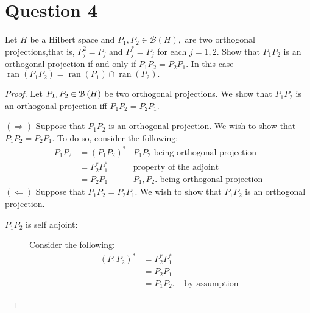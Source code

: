 \section{Question 4}
\horz

Let $H$ be a Hilbert space and $P_1, P_2\in \mathcal B(H),$ are two orthogonal projections,that is, $P_j^2=P_j$ and $P_j^*=P_j$ for each $j=1,2$. Show that $P_1P_2$ is an orthogonal projection if and only if $P_1P_2= P_2P_1.$ In this case $\operatorname{ran} (P_1P_2)= \operatorname{ran} (P_1) \cap \operatorname {ran}(P_2).$

\horz

\begin{proof}
    Let $P_{1}, P_{2} \in {\cal B} \left( H \right)$ be two orthogonal projections.
    We show that $P_{1} P_{2}$ is an orthogonal projection iff $P_{1} P_{2} = P_{2} P_{1}$. 

    $\left( \Longrightarrow \right)$ Suppose that $P_{1} P_{2}$ is an orthogonal projection. We wish to show that $P_{1} P_{2} = P_{2} P_{1}$. To do so, consider the following:
    \begin{align*}
	P_{1} P_{2} &= \left( P_{1} P_{2} \right) ^{*} & P_{1} P_{2} \text{ being orthogonal projection} \\
	&= P_{2}^{*} P_{1} ^{*} & \text{property of the adjoint}\\
	&= P_{2} P_{1} & P_{1}, P_{2}. \text{ being orthogonal projection}
    \end{align*}
    $\left( \Longleftarrow \right)$ Suppose that $P_{1} P_{2} = P_{2} P_{1}$. We wish to show that $P_{1}P_{2}$ is an orthogonal projection. 
    \begin{description}
	\item[$P_{1}P_{2}$ is self adjoint:] Consider the following:
	    \begin{align*}
		(P_{1} P_{2})^{*} &= P_{2}^{*} P_{1} ^{*} \\
		&= P_{2} P_{1} \\
		&= P_{1} P_{2}. & \text{ by assumption }
	    \end{align*}


\end{description}
\end{proof}
